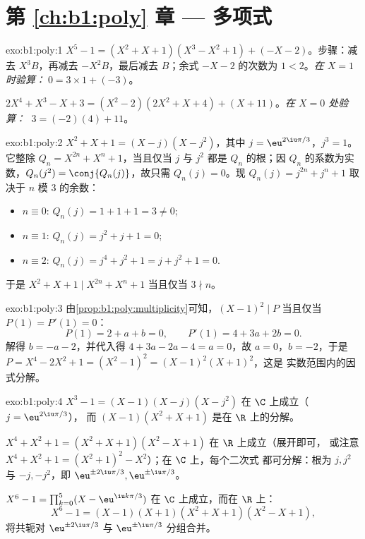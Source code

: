 \section*{第 \ref{ch:b1:poly} 章 --- 多项式}

\begin{solution}{exo:b1:poly:1}
$X^5 - 1 = (X^2 + X + 1)(X^3 - X^2 + 1) + (-X - 2)$。步骤：减去
$X^3 B$，再减去 $-X^2 B$，最后减去 $B$；余式 $-X - 2$ 的次数为
$1 < 2$。\emph{在 $X = 1$ 时验算：}$\;0 = 3 \times 1 + (-3)$。

$2X^4 + X^3 - X + 3 = (X^2 - 2)(2X^2 + X + 4) + (X + 11)$。\emph{在
$X = 0$ 处验算：} $\;3 = (-2)(4) + 11$。
\end{solution}

\begin{solution}{exo:b1:poly:2}
$X^2 + X + 1 = (X - j)(X - j^2)$，其中 $j = \eu^{2\iu\pi/3}$，$j^3 =
1$。它整除 $Q_n = X^{2n} + X^n + 1$，当且仅当 $j$ 与 $j^2$ 都是
$Q_n$ 的根；因 $Q_n$ 的系数为实数，$Q_n(j^2) =
\conj{Q_n(j)}$，故只需 $Q_n(j) = 0$。现 $Q_n(j) =
j^{2n} + j^n + 1$ 取决于 $n$ 模 $3$ 的余数：
\begin{itemize}
  \item $n \equiv 0$: $Q_n(j) = 1 + 1 + 1 = 3 \neq 0$;
  \item $n \equiv 1$: $Q_n(j) = j^2 + j + 1 = 0$;
  \item $n \equiv 2$: $Q_n(j) = j^4 + j^2 + 1 = j + j^2 + 1 = 0$.
\end{itemize}
于是 $X^2 + X + 1 \mid X^{2n} + X^n + 1$ 当且仅当 $3 \nmid n$。
\end{solution}

\begin{solution}{exo:b1:poly:3}
由\cref{prop:b1:poly:multiplicity}可知，$(X-1)^2 \mid P$ 当且仅当 $P(1) =
P'(1) = 0$：
\[
P(1) = 2 + a + b = 0, \qquad P'(1) = 4 + 3a + 2b = 0 .
\]
解得 $b = -a - 2$，并代入得 $4 + 3a - 2a - 4 = a = 0$，故 $a = 0$，$b =
-2$，于是 $P = X^4 - 2X^2 + 1 = (X^2 - 1)^2 = (X-1)^2 (X+1)^2$，这是
实数范围内的因式分解。
\end{solution}

\begin{solution}{exo:b1:poly:4}
$X^3 - 1 = (X - 1)(X - j)(X - j^2)$ 在 $\C$ 上成立（$j = \eu^{2\iu\pi/3}$），
而 $(X - 1)(X^2 + X + 1)$ 是在 $\R$ 上的分解。

$X^4 + X^2 + 1 = (X^2 + X + 1)(X^2 - X + 1)$ 在 $\R$ 上成立（展开即可，
或注意 $X^4 + X^2 + 1 = (X^2+1)^2 - X^2$）；在 $\C$ 上，每个二次式
都可分解：根为 $j, j^2$ 与 $-j, -j^2$，即 $\eu^{\pm 2\iu\pi/3},
\eu^{\pm\iu\pi/3}$。

$X^6 - 1 = \prod_{k=0}^{5} (X - \eu^{\iu k\pi/3})$ 在 $\C$ 上成立，而在
$\R$ 上：
\[
X^6 - 1 = (X-1)(X+1)(X^2 + X + 1)(X^2 - X + 1),
\]
将共轭对 $\eu^{\pm 2\iu\pi/3}$ 与 $\eu^{\pm
\iu\pi/3}$ 分组合并。
\end{solution}

